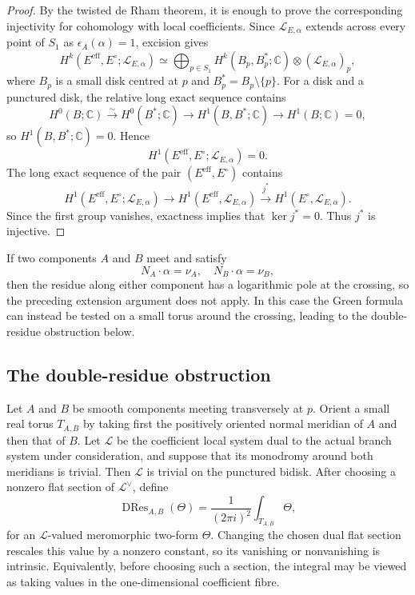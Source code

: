 \documentclass[12pt]{amsart}
\numberwithin{equation}{section}
\theoremstyle{plain}
\theoremstyle{definition}
\theoremstyle{remark}
\theoremstyle{definition}
\DeclareMathOperator{\DRes}{DRes}
\newcommand{\C}{\mathbb C}
\newcommand{\Lcal}{\mathscr L}
\begin{document}
\begin{proof}
By the twisted de Rham theorem, it is enough to prove the corresponding injectivity for cohomology with local coefficients. Since $\Lcal_{E,\alpha}$ extends across every point of $S_1$ as $\epsilon_A(\alpha)=1$, excision gives
\begin{equation*}
H^k(E^{\mathrm{eff}},E^\circ;\Lcal_{E,\alpha})\simeq\bigoplus_{p\in S_1}H^k(B_p,B_p^*;\C)\otimes(\Lcal_{E,\alpha})_p,
\end{equation*}
where $B_p$ is a small disk centred at $p$ and $B_p^*=B_p\setminus\{p\}$. For a disk and a punctured disk, the relative long exact sequence contains
\begin{equation*}
H^0(B;\C)\xrightarrow{\sim}H^0(B^*;\C)\to H^1(B,B^*;\C)\to H^1(B;\C)=0,
\end{equation*}
so $H^1(B,B^*;\C)=0$. Hence
\begin{equation*}
H^1(E^{\mathrm{eff}},E^\circ;\Lcal_{E,\alpha})=0.
\end{equation*}
The long exact sequence of the pair $(E^{\mathrm{eff}},E^\circ)$ contains
\begin{equation*}
H^1(E^{\mathrm{eff}},E^\circ;\Lcal_{E,\alpha})\to H^1(E^{\mathrm{eff}},\Lcal_{E,\alpha})\xrightarrow{j^*}H^1(E^\circ,\Lcal_{E,\alpha}).
\end{equation*}
Since the first group vanishes, exactness implies that $\ker j^*=0$. Thus $j^*$ is injective.
\end{proof}

If two components $A$ and $B$ meet and satisfy
\begin{equation*}
N_A\cdot\alpha=\nu_A,\quad N_B\cdot\alpha=\nu_B,
\end{equation*}
then the residue along either component has a logarithmic pole at the crossing, so the preceding extension argument does not apply. In this case the Green formula can instead be tested on a small torus around the crossing, leading to the double-residue obstruction below.

\subsection{The double-residue obstruction}

Let $A$ and $B$ be smooth components meeting transversely at $p$. Orient a small real torus $T_{A,B}$ by taking first the positively oriented normal meridian of $A$ and then that of $B$. Let $\Lcal$ be the coefficient local system dual to the actual branch system under consideration, and suppose that its monodromy around both meridians is trivial. Then $\Lcal$ is trivial on the punctured bidisk. After choosing a nonzero flat section of $\Lcal^\vee$, define
\begin{equation}\label{eq:double-residue-torus}
\DRes_{A,B}(\Theta)=\frac{1}{(2\pi i)^2}\int_{T_{A,B}}\Theta,
\end{equation}
for an $\Lcal$-valued meromorphic two-form $\Theta$.
Changing the chosen dual flat section rescales this value by a nonzero constant, so its vanishing or nonvanishing is intrinsic. Equivalently, before choosing such a section, the integral may be viewed as taking values in the one-dimensional coefficient fibre.
\end{document}

